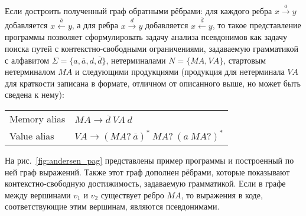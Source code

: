 Если достроить полученный граф обратными рёбрами: для каждого ребра $x \xrightarrow{a} y$ добавляется $x \xleftarrow{\overline{a}} y$, а для ребра $x \xrightarrow{d} y$ добавляется $x \xleftarrow{\overline{d}} y$, то такое представление программы позволяет сформулировать задачу анализа псевдонимов как задачу поиска путей с контекстно-свободными ограничениями, задаваемую грамматикой с алфавитом $\Sigma=\{a, \overline{a}, d, \overline{d}\}$, нетерминалами $N=\{\mathit{MA}, \mathit{VA}\}$, стартовым нетерминалом $\mathit{MA}$ и следующими продукциями (продукция для нетерминала $\mathit{VA}$ для краткости записана в формате, отличном от описанного выше, но может быть сведена к нему):
\begin{table}[h!]
    \centering
    \begin{tabular}{ll}
        Memory alias & $\mathit{MA} \to \overline{d}\ \mathit{VA} \ d$ \\
        Value alias & $\mathit{VA} \to (\mathit{MA}?\ \overline{a})^*\ \mathit{MA}?\ (a\ \mathit{MA}?)^*$ \\
    \end{tabular} 
\end{table}

На рис.~\ref{fig:andersen_pag} представлены пример программы и построенный по ней граф выражений. Также этот граф дополнен рёбрами, которые показывают контекстно-свободную достижимость, задаваемую грамматикой. Если в графе между вершинами $v_1$ и $v_2$ существует ребро $\mathit{MA}$, то выражения в коде, соответствующие этим вершинам, являются псевдонимами.

